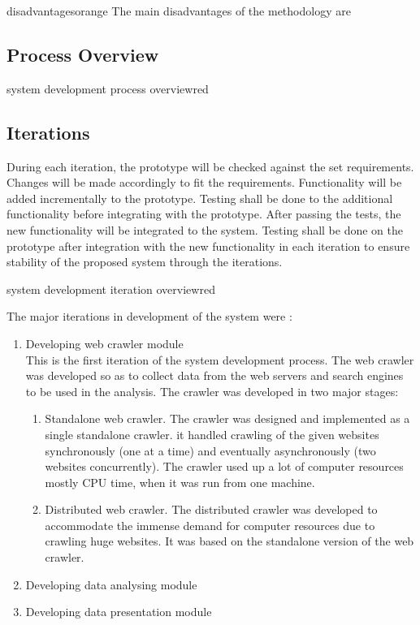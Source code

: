 \begin{review_comment}{disadvantages}{orange}
{The main disadvantages of the methodology are}
\end{review_comment}

\subsection{Process Overview}
\begin{review_comment}{system development process overview}{red}{}
\end{review_comment}

\subsection{Iterations}
\noindent
During each iteration, the prototype will be checked against the set requirements. Changes will be made accordingly to fit the requirements.
Functionality will be added incrementally to the prototype. Testing shall be done to the additional functionality before integrating with the prototype. After passing the tests, the new functionality will
be integrated to the system.
Testing shall be done on the prototype after integration with the new functionality in each iteration to ensure stability of the proposed system through the iterations.

\begin{review_comment}{system development iteration overview}{red}{}
\end{review_comment}

\noindent
The major iterations in development of the system were :
\begin{enumerate}
\item Developing web crawler module\\
This is the first iteration of the system development process. The web crawler was developed so as
to collect data from the web servers and search engines to be used in the analysis. The crawler was
developed in two major stages:
\begin{enumerate}
\item Standalone web crawler.
The crawler was designed and implemented as a single standalone crawler. it handled crawling of
the given websites synchronously (one at a time) and eventually asynchronously (two websites concurrently). The crawler used up a lot of computer resources mostly CPU time, when it was run from one machine.
\item Distributed web crawler. 
The distributed crawler was developed to accommodate the immense demand for computer resources due to crawling huge websites. It was based on the standalone version of the web crawler.
\end{enumerate}
\item Developing data analysing module\\
\item Developing data presentation module\\
\end{enumerate}

